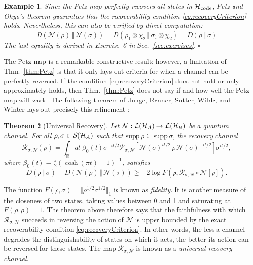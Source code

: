 \documentclass[a4paper,11pt]{article}
\newtheorem{thm}{Theorem}[section]
\newtheorem{example}[thm]{Example}
\newenvironment{eg}{\begin{example}  \rm  }{    \end{example} }
\newcommand{\eop}{{\hspace*{\fill}$\square$}}
\newcommand{\Sec}[1]{Sec.~\ref{#1}}
\newcommand{\rent}[2]{D( #1 \, \Vert \, #2 )}
\newcommand{\Hil}{{\cal H}}
\newcommand{\mrm}[1]{\mathrm{#1}}
\begin{document}
\begin{eg}
Since the Petz map perfectly recovers all states in $\Hil_\mrm{code}$, Petz and Ohya's theorem guarantees that the recoverability condition \eqref{eq:recoveryCriterion} holds.
Nevertheless, this can also be verified by direct computation:
\begin{equation}
\rent{\mathcal{N}(\rho)}{\mathcal{N}(\sigma)} = \rent{\rho_1 \otimes \chi_2}{\sigma_1 \otimes \chi_2} = \rent{\rho}{\sigma}
\end{equation}
The last equality is derived in Exercise~6 in \Sec{sec:exercises}.
\eop
\end{eg}

The Petz map is a remarkable constructive result; however, a limitation of Thm.~\ref{thm:Petz} is that it only lays out criteria for when a channel can be perfectly reversed.
If the condition \eqref{eq:recoveryCriterion} does not hold or only approximately holds, then Thm.~\ref{thm:Petz} does not say if and how well the Petz map will work.
The following theorem of Junge, Renner, Sutter, Wilde, and Winter lays out precisely this refinement \cite{Junge:2015lmb}:
\begin{thm}[Universal Recovery] \label{thm:universal}
Let $\mathcal{N} : \mathcal{L}(\Hil_A) \rightarrow \mathcal{L}(\Hil_B)$ be a quantum channel.
For all $\rho, \sigma \in \mathcal{S}(\Hil_A)$ such that $\mrm{supp} \, \rho \subseteq \mrm{supp} \, \sigma$, the recovery channel
\begin{equation}
\mathcal{R}_{\sigma, \mathcal{N}}(\rho) = \int_\mathbb{R} dt ~ \beta_0(t) \sigma^{-it/2} \mathcal{P}_{\sigma,\mathcal{N}}\left[ \mathcal{N}(\sigma)^{it/2} \, \rho \, \mathcal{N}(\sigma)^{-it/2}  \right] \sigma^{it/2},
\end{equation}
where $\beta_0(t) = \tfrac{\pi}{2} (\cosh(\pi t) + 1)^{-1}$, satisfies
\begin{equation} \label{eq:universalBound}
\rent{\rho}{\sigma} - \rent{\mathcal{N}(\rho)}{\mathcal{N}(\sigma)} \geq -2 \log F(\rho, \mathcal{R}_{\sigma, \mathcal{N}} \circ \mathcal{N}[\rho]).
\end{equation}
\end{thm}
The function $F(\rho,\sigma) = \Vert \rho^{1/2} \sigma^{1/2} \Vert_1$ is known as \emph{fidelity}. 
It is another measure of the closeness of two states, taking values between 0 and 1 and saturating at $F(\rho,\rho) = 1$.
The theorem above therefore says that the faithfulness with which $\mathcal{R}_{\sigma, \mathcal{N}}$ succeeds in reversing the action of $\mathcal{N}$ is upper bounded by the exact recoverability condition \eqref{eq:recoveryCriterion}.
In other words, the less a channel degrades the distinguishability of states on which it acts, the better its action can be reversed for these states.
The map $\mathcal{R}_{\sigma, \mathcal{N}}$ is known as a \emph{universal recovery channel}.
\end{document}
